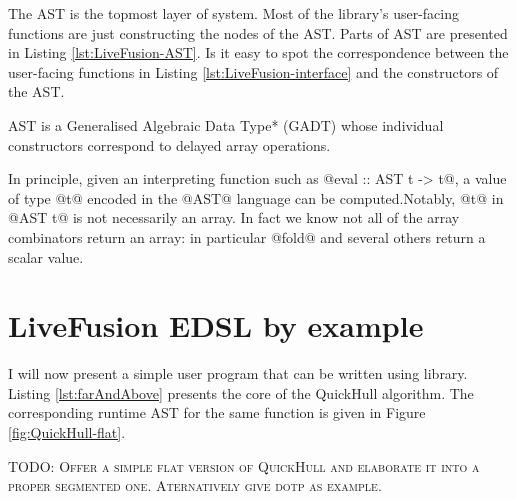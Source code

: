 \documentclass[preamble.tex]{subfiles}
\begin{document}
The AST is the topmost layer of \LiveFusion system. Most of the library's user-facing functions are just constructing the nodes of the AST. Parts of \LiveFusion AST are presented in Listing \ref{lst:LiveFusion-AST}. Is it easy to spot the correspondence between the user-facing functions in Listing \ref{lst:LiveFusion-interface} and the constructors of the AST.

\LiveFusion AST is a \*Generalised Algebraic Data Type* (GADT) \cite{Jones:2006eh} whose individual constructors correspond to delayed array operations.

In principle, given an interpreting function such as @eval :: AST t -> t@, a value of type @t@ encoded in the @AST@ language can be computed.Notably, @t@ in @AST t@ is not necessarily an array. In fact we know not all of the array combinators return an array: in particular @fold@ and several others return a scalar value.

\section{LiveFusion EDSL by example}

I will now present a simple user program that can be written using \LiveFusion library. Listing \ref{lst:farAndAbove} presents the core of the QuickHull algorithm. The corresponding runtime AST for the same function is given in Figure \ref{fig:QuickHull-flat}.

\textsc{TODO: Offer a simple flat version of QuickHull and elaborate it into a proper segmented one. Aternatively give dotp as example.}

\end{document}
